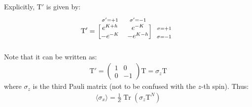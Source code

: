 \documentclass[12pt,a4paper]{report}
\begin{document}
\begin{enumerate}
        Explicitly, $\mathrm{T}'$ is given by:
        \begin{align*}
            \mathrm{T}' = \begin{blockarray}{l*{2}{c}}
                \begin{block}{*{2}{>{\scriptstyle}c<{}}l}
                    \sigma'=+1 & \sigma'=-1 & \\
                \end{block}
                \begin{block}{[*{2}{c}]>{\scriptstyle}r<{}}
                    e^{K+h} & e^{-K} & \sigma=+1 \\
                    -e^{-K}   & -e^{K-h} & \sigma = -1\\
                \end{block}
            \end{blockarray}
        \end{align*}
        Note that it can be written as:
        \begin{align*}
            \mathrm{T}' = \begin{pmatrix}
                1 & 0\\
                0 & -1
            \end{pmatrix} \mathrm{T} = \sigma_z \mathrm{T}
        \end{align*}
        where $\sigma_z$ is the third Pauli matrix (not to be confused with the $z$-th spin). Thus:
        \begin{align*}
            \langle \sigma_x \rangle = \frac{1}{Z} \operatorname{Tr}(\sigma_z \mathrm{T}^N)  
        \end{align*}


\end{enumerate}
\end{document}
